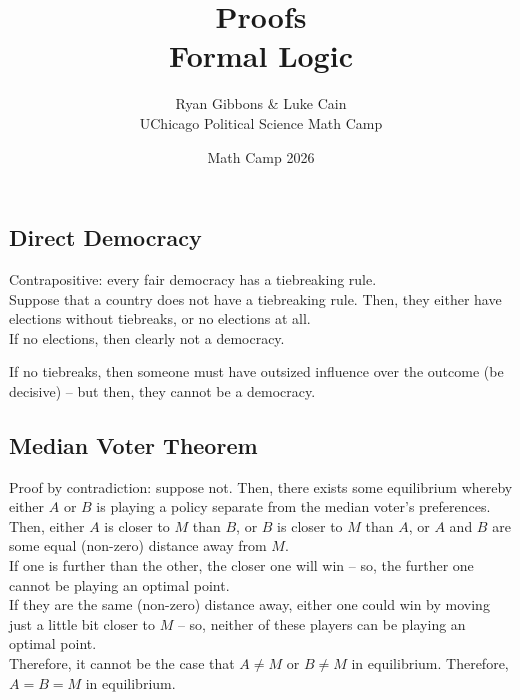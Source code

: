 \documentclass[11pt]{article}
\title{Proofs \\[0.35em] \large Formal Logic}
\author{Ryan Gibbons \& Luke Cain \\ UChicago Political Science Math Camp}
\date{Math Camp 2026}
\theoremstyle{plain}
\theoremstyle{definition}
\theoremstyle{remark}
\begin{document}
\maketitle

\subsection*{Direct Democracy}

Contrapositive: every fair democracy has a tiebreaking rule. \\

Suppose that a country does not have a tiebreaking rule. Then, they either have elections without tiebreaks, or no elections at all. \\

If no elections, then clearly not a democracy.

If no tiebreaks, then someone must have outsized influence over the outcome (be decisive) -- but then, they cannot be a democracy. 


\subsection*{Median Voter Theorem}

Proof by contradiction: suppose not. Then, there exists some equilibrium whereby either $A$ or $B$ is playing a policy separate from the median voter's preferences. \\

Then, either $A$ is closer to $M$ than $B$, or $B$ is closer to $M$ than $A$, or $A$ and $B$ are some equal (non-zero) distance away from $M$. \\

If one is further than the other, the closer one will win -- so, the further one cannot be playing an optimal point. \\

If they are the same (non-zero) distance away, either one could win by moving just a little bit closer to $M$ -- so, neither of these players can be playing an optimal point. \\

Therefore, it cannot be the case that $A \neq M$ or $B \neq M$ in equilibrium. Therefore, $A = B = M$ in equilibrium.
\end{document}
